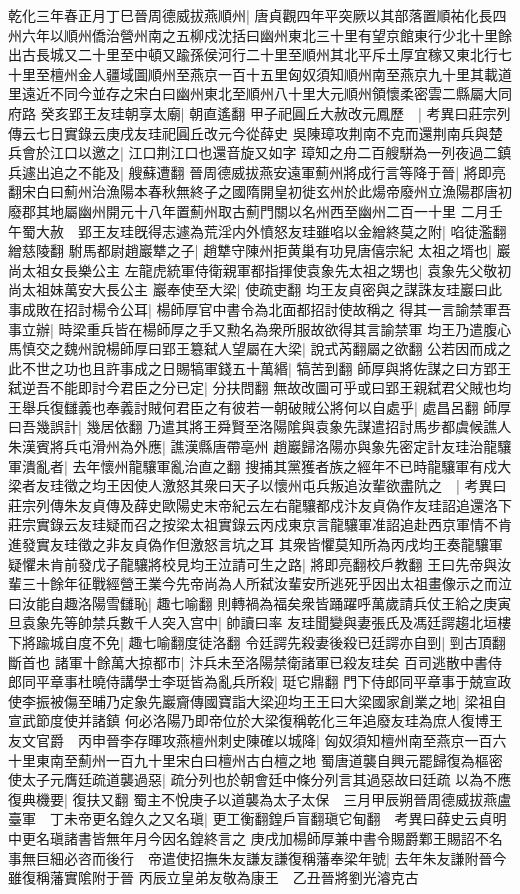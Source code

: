 乾化三年春正月丁巳晉周德威拔燕順州|{
	唐貞觀四年平突厥以其部落置順祐化長四州六年以順州僑治營州南之五柳戍沈括曰幽州東北三十里有望京館東行少北十里餘出古長城又二十里至中頓又踰孫侯河行二十里至順州其北平斥土厚宜稼又東北行七十里至檀州金人疆域圖順州至燕京一百十五里匈奴須知順州南至燕京九十里其載道里遠近不同今並存之宋白曰幽州東北至順州八十里大元順州領懷柔密雲二縣屬大同府路}
癸亥郢王友珪朝享太廟|{
	朝直遙翻}
甲子祀圓丘大赦改元鳳歷　|{
	考異曰莊宗列傳云七日實錄云庚戌友珪祀圓丘改元今從薛史}
吳陳璋攻荆南不克而還荆南兵與楚兵會於江口以邀之|{
	江口荆江口也還音旋又如字}
璋知之舟二百艘駢為一列夜過二鎮兵遽出追之不能及|{
	艘蘇遭翻}
晉周德威拔燕安遠軍薊州將成行言等降于晉|{
	將即亮翻宋白曰薊州治漁陽本春秋無終子之國隋開皇初徙玄州於此煬帝廢州立漁陽郡唐初廢郡其地屬幽州開元十八年置薊州取古薊門關以名州西至幽州二百一十里}
二月壬午蜀大赦　郢王友珪旣得志遽為荒淫内外憤怒友珪雖啗以金繒終莫之附|{
	啗徒濫翻繒慈陵翻}
駙馬都尉趙巖犨之子|{
	趙犨守陳州拒黄巢有功見唐僖宗紀}
太祖之壻也|{
	巖尚太祖女長樂公主}
左龍虎統軍侍衛親軍都指揮使袁象先太祖之甥也|{
	袁象先父敬初尚太祖妹萬安大長公主}
巖奉使至大梁|{
	使疏吏翻}
均王友貞密與之謀誅友珪巖曰此事成敗在招討楊令公耳|{
	楊師厚官中書令為北面都招討使故稱之}
得其一言諭禁軍吾事立辦|{
	時梁重兵皆在楊師厚之手又勲名為衆所服故欲得其言諭禁軍}
均王乃遣腹心馬慎交之魏州說楊師厚曰郢王簒弑人望屬在大梁|{
	說式芮翻屬之欲翻}
公若因而成之此不世之功也且許事成之日賜犒軍錢五十萬緡|{
	犒苦到翻}
師厚與將佐謀之曰方郢王弑逆吾不能即討今君臣之分已定|{
	分扶問翻}
無故改圖可乎或曰郢王親弑君父賊也均王舉兵復讎義也奉義討賊何君臣之有彼若一朝破賊公將何以自處乎|{
	處昌呂翻}
師厚曰吾幾誤計|{
	幾居依翻}
乃遣其將王舜賢至洛陽隂與袁象先謀遣招討馬步都虞候譙人朱漢賓將兵屯滑州為外應|{
	譙漢縣唐帶亳州}
趙巖歸洛陽亦與象先密定計友珪治龍驤軍潰亂者|{
	去年懷州龍驤軍亂治直之翻}
搜捕其黨獲者族之經年不已時龍驤軍有戍大梁者友珪徵之均王因使人激怒其衆曰天子以懷州屯兵叛追汝輩欲盡阬之　|{
	考異曰莊宗列傳朱友貞傳及薛史歐陽史末帝紀云左右龍驤都戍汴友貞偽作友珪詔追還洛下莊宗實錄云友珪疑而召之按梁太祖實錄云丙戍東京言龍驤軍准詔追赴西京軍情不肯進發實友珪徵之非友貞偽作但激怒言坑之耳}
其衆皆懼莫知所為丙戌均王奏龍驤軍疑懼未肯前發戊子龍驤將校見均王泣請可生之路|{
	將即亮翻校戶教翻}
王曰先帝與汝輩三十餘年征戰經營王業今先帝尚為人所弑汝輩安所逃死乎因出太祖畫像示之而泣曰汝能自趣洛陽雪讎恥|{
	趣七喻翻}
則轉禍為福矣衆皆踊躍呼萬歲請兵仗王給之庚寅旦袁象先等帥禁兵數千人突入宫中|{
	帥讀曰率}
友珪聞變與妻張氏及馮廷諤趨北垣樓下將踰城自度不免|{
	趣七喻翻度徒洛翻}
令廷諤先殺妻後殺已廷諤亦自剄|{
	剄古頂翻斷首也}
諸軍十餘萬大掠都市|{
	汴兵未至洛陽禁衛諸軍已殺友珪矣}
百司逃散中書侍郎同平章事杜曉侍講學士李珽皆為亂兵所殺|{
	珽它鼎翻}
門下侍郎同平章事于兢宣政使李振被傷至晡乃定象先巖齎傳國寶詣大梁迎均王王曰大梁國家創業之地|{
	梁祖自宣武節度使并諸鎮}
何必洛陽乃即帝位於大梁復稱乾化三年追廢友珪為庶人復博王友文官爵　丙申晉李存暉攻燕檀州刺史陳確以城降|{
	匈奴須知檀州南至燕京一百六十里東南至薊州一百九十里宋白曰檀州古白檀之地}
蜀唐道襲自興元罷歸復為樞密使太子元膺廷疏道襲過惡|{
	疏分列也於朝會廷中條分列言其過惡故曰廷疏}
以為不應復典機要|{
	復扶又翻}
蜀主不悅庚子以道襲為太子太保　三月甲辰朔晉周德威拔燕盧臺軍　丁未帝更名鍠久之又名瑱|{
	更工衡翻鍠戶盲翻瑱它甸翻　考異曰薛史云貞明中更名瑱諸書皆無年月今因名鍠終言之}
庚戌加楊師厚兼中書令賜爵鄴王賜詔不名事無巨細必咨而後行　帝遣使招撫朱友謙友謙復稱藩奉梁年號|{
	去年朱友謙附晉今雖復稱藩實隂附于晉}
丙辰立皇弟友敬為康王　乙丑晉將劉光濬克古

